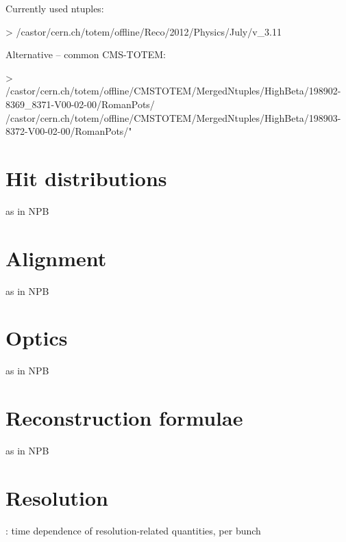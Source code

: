 \> Currently used ntuples:

\>> /castor/cern.ch/totem/offline/Reco/2012/Physics/July/v\_3.11


\> Alternative -- common CMS-TOTEM:

\>>	/castor/cern.ch/totem/offline/CMSTOTEM/MergedNtuples/HighBeta/198902-8369\_8371-V00-02-00/RomanPots/ \\
	/castor/cern.ch/totem/offline/CMSTOTEM/MergedNtuples/HighBeta/198903-8372-V00-02-00/RomanPots/"

\section{Hit distributions}

\> as in NPB

\section{Alignment}

\> as in NPB

\section{Optics}

\> as in NPB

\section{Reconstruction formulae}

\> as in NPB

\section{Resolution}

\>  : time dependence of resolution-related quantities, per bunch



